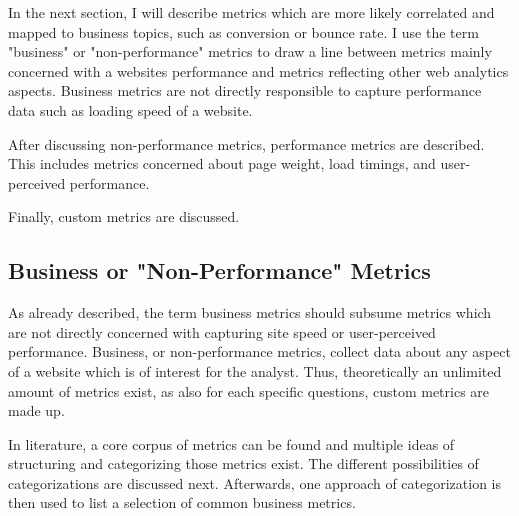 
In the next section, I will describe metrics which are more likely correlated and mapped to business topics, such as conversion or bounce rate.
I use the term "business" or "non-performance" metrics to draw a line between metrics mainly concerned with a websites performance and metrics reflecting other web analytics aspects.
Business metrics are not directly responsible to capture performance data such as loading speed of a website.

After discussing non-performance metrics, performance metrics are described.
This includes metrics concerned about page weight, load timings, and user-perceived performance.

Finally, custom metrics are discussed.














\subsection{Business or "Non-Performance" Metrics}


As already described, the term business metrics should subsume metrics which are not directly concerned with capturing site speed or user-perceived performance.
Business, or non-performance metrics, collect data about any aspect of a website which is of interest for the analyst.
Thus, theoretically an unlimited amount of metrics exist, as also for each specific questions, custom metrics are made up.

In literature, a core corpus of metrics can be found and multiple ideas of structuring and categorizing those metrics exist.
The different possibilities of categorizations are discussed next.
Afterwards, one approach of categorization is then used to list a selection of common business metrics.






